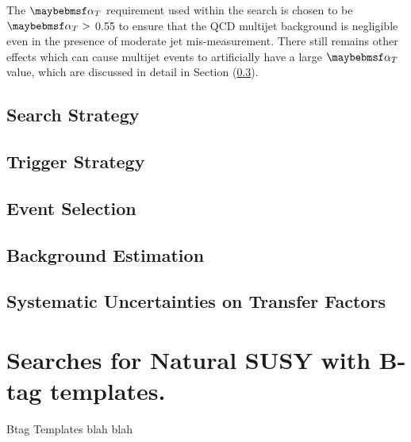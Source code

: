 The $\alphat$ requirement used within the search is chosen to be $\alphat >$ 0.55 to ensure that the QCD multijet background is negligible even in the presence of moderate jet mis-measurement. There still remains other effects which can cause multijet events to artificially have a large $\alphat$ value, which are discussed in detail in Section (\ref{subsec:eventselection}).  


\subsection{Search Strategy}
\label{subsec:searchstrategy}

\subsection{Trigger Strategy}
\label{subsec:triggerstrategy}

\subsection{Event Selection}
\label{subsec:eventselection}


\subsection{Background Estimation}
\label{subsec:backgroundestimation}


\subsection{Systematic Uncertainties on Transfer Factors}
\label{subsec:sysuncertainties}

\section{Searches for Natural SUSY with B-tag templates.}
\label{sec:templatemethod}

Btag Templates blah blah

